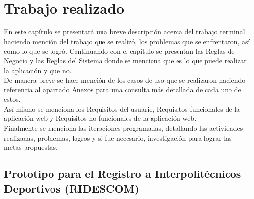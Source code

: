 \chapter{Trabajo realizado}

	\noindent En este capítulo se presentará una breve descripción acerca del trabajo terminal haciendo mención del trabajo que se realizó, los problemas que se enfrentaron, así como lo que se logró. Continuando con el capítulo se presentan las Reglas de Negocio y las Reglas del Sistema donde se menciona que es lo que puede realizar la aplicación y que no.\\
	De manera breve  se hace mención de los casos de uso que se realizaron haciendo referencia al apartado Anexos para una consulta más detallada de cada uno de estos.\\
	Así mismo se menciona los Requisitos del usuario, Requisitos funcionales de la aplicación web y Requisitos no funcionales de la aplicación web.\\
	Finalmente se menciona las iteraciones programadas, detallando las actividades realizadas, problemas, logros y si fue necesario, investigación para lograr las metas propuestas.\\
	
	
	\section{Prototipo para el Registro a Interpolit\'ecnicos Deportivos (RIDESCOM)}
	
